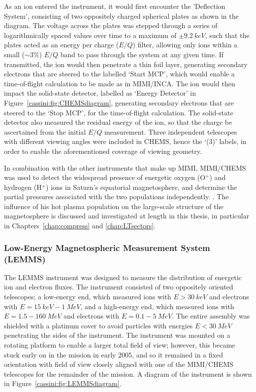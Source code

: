 As an ion entered the instrument, it would first encounter the 'Deflection System', consisting of two oppositely charged spherical plates as shown in the diagram. The voltage across the plates was stepped through a series of logarithmically spaced  values over time to a maximum  of $\pm\SI{9.2}{keV}$, such that the plates acted as an energy per charge ($E/Q$) filter, allowing only ions within a small (${\sim}{3}{\%}$)  $E/Q$ band to pass through the system at any given time. If transmitted, the ion would then penetrate a thin foil layer, generating  secondary electrons that are  steered to the labelled `Start MCP', which would enable a time-of-flight calculation to be made as in MIMI/INCA. The ion would then impact the solid-state detector, labelled as `Energy Detector' in Figure~\ref{cassini:fig:CHEMSdiagram}, generating  secondary electrons that are steered to the `Stop MCP',  for the time-of-flight calculation. The solid-state detector also measured the residual energy of the ion, so that the charge be ascertained from the initial $E/Q$ measurement. Three independent telescopes with different viewing angles were included in CHEMS, hence the `(3)' labels, in order to enable the  aforementioned coverage of viewing geometry.

In combination with the other instruments that make up MIMI, MIMI/CHEMS was used to detect the widespread presence of energetic oxygen (O$^+$) and hydrogen (H$^+$) ions in Saturn's equatorial magnetosphere, and determine the partial pressures associated with the two populations independently. \citep[e.g.][]{sergis2009}. The influence of his hot plasma population on  the large-scale structure of the magnetosphere is discussed and investigated at length in this  thesis, in particular in Chapters~\ref{chap:compress} and \ref{chap:LTsectors}.

\subsubsection{Low-Energy Magnetospheric Measurement System (LEMMS)}
The LEMMS instrument was designed to measure the distribution of energetic ion and electron fluxes. The instrument consisted of two oppositely oriented telescopes; a low-energy end, which measured ions with $E>\SI{30}{keV}$ and electrons with $E=\SI{15}{keV}{-}\SI{1}{MeV}$, and a high-energy  end, which measured  ions with $E=1.5-\SI{160}{MeV}$ and electrons with $E=0.1{-}\SI{5}{MeV}$. The entire assembly was shielded with a platinum cover to avoid particles with energies $E<\SI{30}{MeV}$ penetrating the sides of the instrument. The instrument  was mounted on  a rotating platform  to enable a larger total field of view; however, this became stuck early on in the mission in early 2005, and so it remained in a fixed orientation with field of view closely aligned with one of the MIMI/CHEMS telescopes for the remainder of  the mission. A diagram of the instrument is shown in Figure~\ref{cassini:fig:LEMMSdiagram}.

